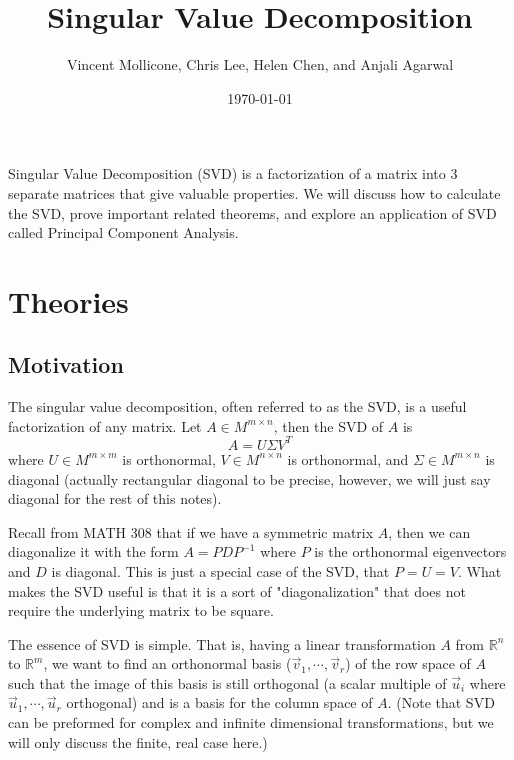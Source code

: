 \documentclass{article}
\title{Singular Value Decomposition}
\author{Vincent Mollicone, Chris Lee, Helen Chen, and Anjali Agarwal}
\date{\today}
\begin{document}
\maketitle
Singular Value Decomposition (SVD) is a factorization of a matrix into 3 separate matrices that give valuable properties. We will discuss how to calculate the SVD, prove important related theorems, and explore an application of SVD called Principal Component Analysis.
\tableofcontents
\newpage

\section{Theories}
\subsection{Motivation}
The singular value decomposition, often referred to as the SVD, is a useful factorization of any matrix. Let $A \in M^{m\times n}$, then the SVD of $A$ is
$$A = U \Sigma V^T$$
where $U\in M^{m\times m}$ is orthonormal, $V\in M^{n\times n}$ is orthonormal, and $\Sigma\in M ^{m\times n}$ is diagonal (actually rectangular diagonal to be precise, however, we will just say diagonal for the rest of this notes).

Recall from MATH 308 that if we have a symmetric matrix $A$, then we can diagonalize it with the form $A=PDP^{-1}$ where $P$ is the orthonormal eigenvectors and $D$ is diagonal. This is just a special case of the SVD, that $P = U = V$. What makes the SVD useful is that it is a sort of "diagonalization" that does not require the underlying matrix to be square.

The essence of SVD is simple. That is, having a linear transformation $A$ from $\mathbb{R}^n$ to $\mathbb{R}^m$, we want to find an orthonormal basis ($\vec{v}_1, \cdots, \vec{v}_r$) of the row space of $A$ such that the image of this basis is still orthogonal (a scalar multiple of $\vec{u}_i$ where $\vec{u}_1, \cdots, \vec{u}_r$ orthogonal) and is a basis for the column space of $A$. (Note that SVD can be preformed for complex and infinite dimensional transformations, but we will only discuss the finite, real case here.)
\end{document}
